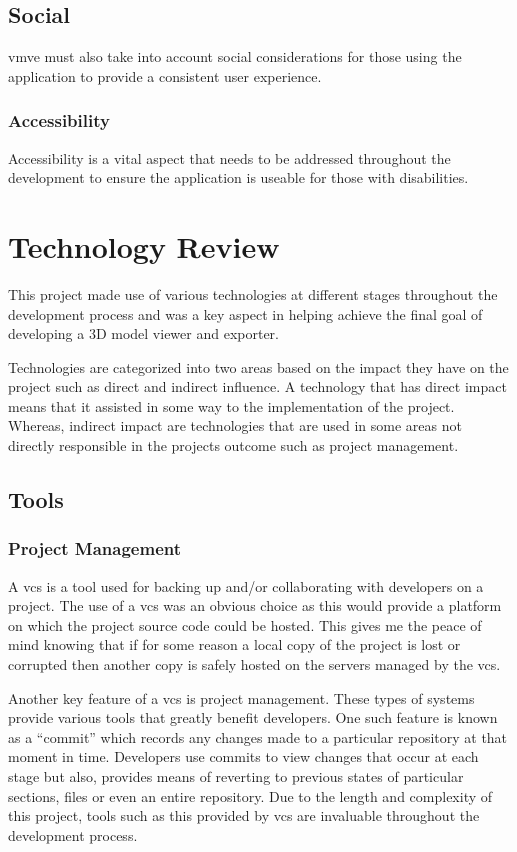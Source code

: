 \documentclass[11pt]{article}
\begin{document}
\subsection{Social}
\gls{vmve} must also take into account social considerations for those using the
application to provide a consistent user experience.

\subsubsection{Accessibility}
Accessibility is a vital aspect that needs to be addressed throughout the
development to ensure the application is useable for those with disabilities.

\section{Technology Review}
This project made use of various technologies at different stages throughout the
development process and was a key aspect in helping achieve the final goal of
developing a 3D model viewer and exporter.

Technologies are categorized into two areas based on the impact they have on the
project such as direct and indirect influence. A technology that has direct
impact means that it assisted in some way to the implementation of the project.
Whereas, indirect impact are technologies that are used in some areas not
directly responsible in the projects outcome such as project management.

\subsection{Tools}

\subsubsection{Project Management}
A \gls{vcs} is a tool used for backing up and/or collaborating with developers
on a project. The use of a \gls{vcs} was an obvious choice as this would provide
a platform on which the project source code could be hosted. This gives me the
peace of mind knowing that if for some reason a local copy of the project is
lost or corrupted then another copy is safely hosted on the servers managed by
the \gls{vcs}.

Another key feature of a \gls{vcs} is project management. These types of systems
provide various tools that greatly benefit developers. One such feature is known
as a ``commit'' which records any changes made to a particular repository at
that moment in time. Developers use commits to view changes that occur at each
stage but also, provides means of reverting to previous states of particular
sections, files or even an entire repository. Due to the length and complexity
of this project, tools such as this provided by \gls{vcs} are invaluable throughout
the development process.
\end{document}
